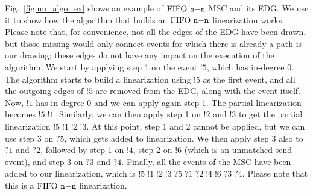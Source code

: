 \begin{example}
	Fig.~\ref{fig:nn_algo_ex} shows an example of $\text{FIFO } \mathtt{n\mathsf{-}n}$ MSC and its EDG. We use it to show how the algorithm that builds an $\text{FIFO } \mathtt{n\mathsf{-}n}$ linearization works. Please note that, for convenience, not all the edges of the EDG have been drawn, but those missing would only connect events for which there is already a path is our drawing; these edges do not have any impact on the execution of the algorithm. We start by applying step 1 on the event $!5$, which has in-degree 0. The algorithm starts to build a linearization using $!5$ as the first event, and all the outgoing edges of $!5$ are removed from the EDG, along with the event itself. Now, $!1$ has in-degree 0 and we can apply again step 1. The partial linearization becomes $!5\;!1$. Similarly, we can then apply step 1 on $!2$ and $!3$ to get the partial linearization $!5\;!1\;!2\;!3$. At this point, step 1 and 2 cannot be applied, but we can use step 3 on $?5$, which gets added to linearization. We then apply step 3 also to $?1$ and $?2$, followed by step 1 on $!4$, step 2 on $!6$ (which is an unmatched send event), and step 3 on $?3$ and $?4$. Finally, all the events of the MSC have been added to our linearization, which is $!5\;!1\;!2\;!3\;?5\;?1\;?2\;!4\;!6\;?3\;?4$. Please note that this is a $\text{FIFO } \mathtt{n\mathsf{-}n}$ linearization.
\end{example}

